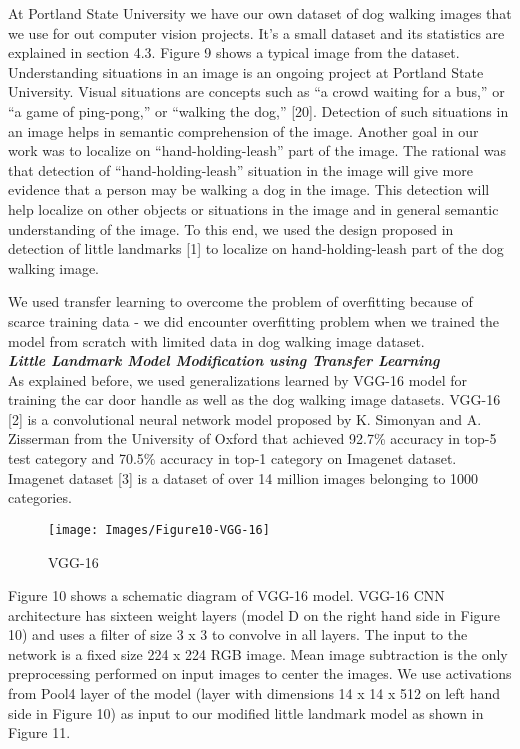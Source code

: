 \documentclass [11pt,letterpaper ,twoside ,openany ]{report}
\begin{document}
    At Portland State University we have our own dataset of dog walking images that we use for out computer vision projects. It's a small dataset and its statistics are explained in section 4.3. Figure 9 shows a typical image from the dataset. Understanding situations in an image is an ongoing project at Portland State University. Visual situations are concepts such as ``a crowd waiting for a bus,'' or ``a game of ping-pong,'' or ``walking the dog,'' [20]. Detection of such situations in an image helps in semantic  comprehension of the image. Another goal in our work was to localize on ``hand-holding-leash'' part of the image. The rational was that detection of ``hand-holding-leash'' situation in the image will give more evidence that a person may be walking a dog in the image. This detection will help localize on other objects or situations in the image and in general semantic understanding of the image. To this end, we used the design proposed in detection of little landmarks [1] to localize on hand-holding-leash part of the dog walking image. 

    We used transfer learning to overcome the problem of overfitting because of scarce training data - we did encounter overfitting problem when we trained the model from scratch with limited data in dog walking image dataset. \\

    \noindent
    \textbf{\textit{Little Landmark Model Modification using Transfer Learning}}\\                   
    As explained before, we used generalizations learned by VGG-16 model for training the car door handle as well as the dog walking image datasets. VGG-16  [2] is a convolutional neural network model proposed by K. Simonyan and A. Zisserman from the University of Oxford that achieved 92.7\% accuracy in top-5 test category and 70.5\% accuracy in top-1 category on Imagenet dataset. Imagenet dataset [3] is a dataset of over 14 million images belonging to 1000 categories.   

    \begin{figure}[h]
      \centering
      \texttt{[image: Images/Figure10-VGG-16]}
      \caption{VGG-16}
      \label{fig:vgg}
    \end{figure}    

    Figure 10 shows a schematic diagram of VGG-16 model. VGG-16 CNN architecture has sixteen weight layers (model D on the right hand side in Figure 10) and uses a filter of size 3 x 3 to convolve in all layers. The input to the network is a fixed size 224 x 224 RGB image. Mean image subtraction is the only preprocessing performed on input images to center the images. We use activations from Pool4 layer of the model (layer with dimensions 14 x 14 x 512 on left hand side in Figure 10) as input to our modified little landmark model as shown in Figure 11.     
\end{document}
